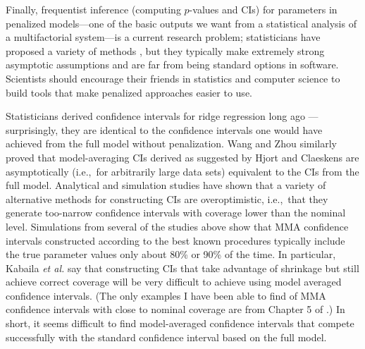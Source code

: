 \documentclass[entropy,article,accept,pdftex,moreauthors]{Definitions/mdpi}
\begin{document}
Finally, frequentist inference (computing \(p\)-values and CIs) for
parameters in penalized models---one of the basic outputs we want from
a statistical analysis of a multifactorial system---is a current
research problem; statisticians have proposed a variety of methods
\cite{ref-potscherConfidence2010a,ref-javanmard_confidence_2014,ref-lockhart_significance_2014,ref-taylorPostselection2018},
but they typically make extremely
strong asymptotic assumptions and are far from being standard options in
software. Scientists should encourage their friends in statistics and
computer science to build tools that make penalized approaches easier to
use.

Statisticians derived confidence intervals for ridge regression long ago
\cite{ref-obenchain_classical_1977}---surprisingly, they are identical to the confidence
intervals one would have achieved from the full model without
penalization. Wang and Zhou \cite{ref-wangInterval2013b} similarly proved that model-averaging
CIs derived as suggested by Hjort and Claeskens \cite{ref-hjortFrequentist2003} are
asymptotically (i.e.,~for arbitrarily large data sets) equivalent to the
CIs from the full model. Analytical and simulation studies
\cite{ref-turek2012model,ref-fletcher2012model,ref-turek2013frequentist,ref-turek2015comparison,ref-kabaila_model-averaged_2016,ref-dormann_model_2018} have shown
that a variety of alternative methods for constructing CIs are
overoptimistic, i.e.,~that they generate too-narrow confidence intervals
with coverage lower than the nominal level. Simulations from several of
the studies above show that MMA confidence intervals constructed
according to the best known procedures typically include the true
parameter values only about 80\% or 90\% of the time. In particular,
Kabaila \emph{et al.} \cite{ref-kabaila_model-averaged_2016} say that constructing CIs that
take advantage of shrinkage but still achieve correct coverage will be
very difficult to achieve using model averaged confidence intervals.
(The only examples I have been able to find of MMA confidence intervals
with close to nominal coverage are from Chapter 5 of \cite{ref-burnham_model_2002}.) In short, it seems difficult to find model-averaged
confidence intervals that compete successfully with the standard
confidence interval based on the full model.
\end{document}
